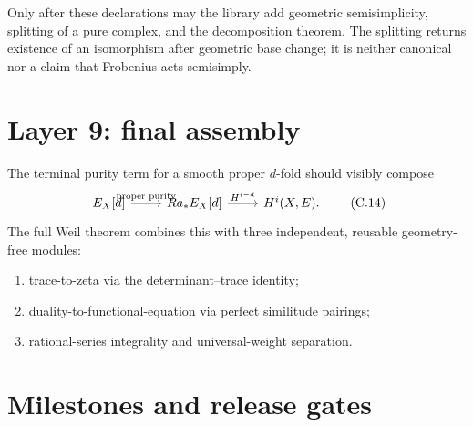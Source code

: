 Only after these declarations may the library add geometric semisimplicity,
splitting of a pure complex, and the decomposition theorem.  The splitting
returns existence of an isomorphism after geometric base change; it is
neither canonical nor a claim that Frobenius acts semisimply.

\section{Layer 9: final assembly}

The terminal purity term for a smooth proper \(d\)-fold should visibly
compose
\[
\begin{tikzcd}
 E_X[d]
 \arrow[r,"\text{proper purity}"]&
 Ra_*E_X[d]
 \arrow[r,"H^{i-d}"]&
 H^i(X,E).
\end{tikzcd}
\tag{C.14}\label{eq:formalization-terminal-term}
\]
The full Weil theorem combines this with three independent, reusable
geometry-free modules:

\begin{enumerate}
\item trace-to-zeta via the determinant--trace identity;
\item duality-to-functional-equation via perfect similitude pairings;
\item rational-series integrality and universal-weight separation.
\end{enumerate}

\section{Milestones and release gates}

